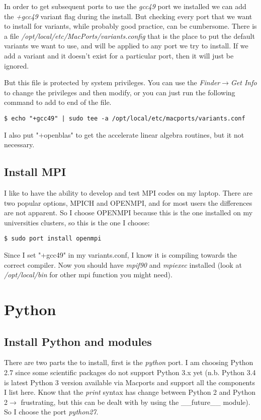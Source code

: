 \documentclass[11pt, A4paper]{article}
\begin{document}
In order to get subsequent ports to use the \textit{gcc49} port we installed we can add the \textit{+gcc49} variant flag during the install. But checking every port that we want to install for variants, while probably good practice, can be cumbersome. There is a file \textit{/opt/local/etc/MacPorts/variants.config} that is the place to put the default variants we want to use, and will be applied to any port we try to install. If we add a variant and it doesn't exist for a particular port, then it will just be ignored.  

But this file is protected by system privileges. You can use the \textit{Finder$\rightarrow$Get Info} to change the privileges and then modify, or you can just run the following command to add to end of the file.
\begin{lstlisting}[style=Bash]
$ echo "+gcc49" | sudo tee -a /opt/local/etc/macports/variants.conf
\end{lstlisting}
I also put "+openblas" to get the accelerate linear algebra routines, but it not necessary.


\subsection{Install MPI}
I like to have the ability to develop and test MPI codes on my laptop. There are two popular options, MPICH and OPENMPI, and for most users the differences are not apparent. So I choose OPENMPI because this is the one installed on my universities clusters, so this is the one I choose:
\begin{lstlisting}[style=Bash]
$ sudo port install openmpi
\end{lstlisting}
Since I set "+gcc49" in my variants.conf, I know it is compiling towards the correct compiler. Now you should have \textit{mpif90} and \textit{mpiexec} installed (look at \textit{/opt/local/bin} for other mpi function you might need).



%
%
\section{Python}
\subsection{Install Python and modules}
There are two parts the to install, first is the \textit{python} port.  I am choosing Python 2.7 since some scientific packages do not support Python 3.x yet (n.b. Python 3.4 is latest Python 3 version available via Macports and support all the components I list here. Know that the  \textit{print} syntax has change between Python 2 and Python 2$\rightarrow$ frustrating, but this can be dealt with by using the \_\_future\_\_ module). So I choose the port \textit{python27}. 
\end{document}
